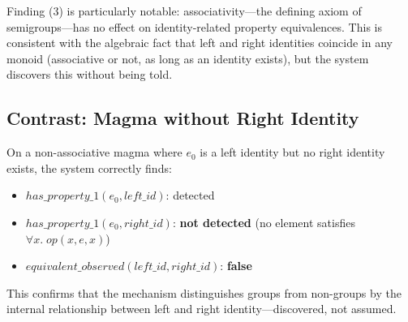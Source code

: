 Finding (3) is particularly notable: associativity---the defining axiom of semigroups---has no effect on identity-related property equivalences. This is consistent with the algebraic fact that left and right identities coincide in any monoid (associative or not, as long as an identity exists), but the system discovers this without being told.

\subsection{Contrast: Magma without Right Identity}

On a non-associative magma where $e_0$ is a left identity but no right identity exists, the system correctly finds:

\begin{itemize}
\item $\mathit{has\_property\_1}(e_0, \mathit{left\_id})$: detected
\item $\mathit{has\_property\_1}(e_0, \mathit{right\_id})$: \textbf{not detected} (no element satisfies $\forall x.\; \mathit{op}(x, e, x)$)
\item $\mathit{equivalent\_observed}(\mathit{left\_id}, \mathit{right\_id})$: \textbf{false}
\end{itemize}

This confirms that the mechanism distinguishes groups from non-groups by the internal relationship between left and right identity---discovered, not assumed.
